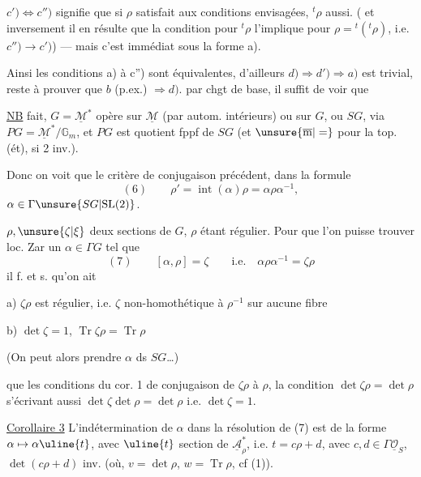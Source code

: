$c')\Longleftrightarrow c'')$ signifie que si $\rho$ satisfait aux conditions envisagées, ${}^t\rho$ aussi. ( et inversement il en résulte que la condition pour ${}^t\rho$ l'implique pour $\rho={}^t({}^t\rho)$\deleted{\unsure{$\}$}}, i.e. $c'')\longrightarrow c')$) --- mais c'est immédiat sous la forme a).

Ainsi les conditions a) à c'') sont équivalentes, d'ailleurs $d)\Longrightarrow d')\Longrightarrow a)$ est trivial, reste à prouver que $b$ (p.ex.) $\Rightarrow d)$.
 par chgt de base, il suffit de voir que




\uline{NB}\quad {} fait, $G=\underline{\mathcal M}^{*}$ opère sur $\underline{\mathcal M}$ (par autom. intérieurs) ou sur $G$, ou $SG$, via $PG=\underline{\mathcal M}^{*}/\mathbb G_m$, et $PG$ est quotient fppf de $SG$ (et $\unsure{\overline{\mathrm m}|=}$ pour la top. (ét), si 2 inv.).

Donc on voit que  le critère de conjugaison précédent, dans la formule
\[
(6)\qquad \rho'=\operatorname{int}(\alpha)\rho=\alpha\rho\alpha^{-1},
\]
 $\alpha\in\Gamma\unsure{SG|\mathrm{SL}(2)}$.

 $\rho,\unsure{\zeta|\xi}$ deux sections de $G$, $\rho$ étant régulier. Pour que l'on puisse trouver loc. Zar un $\alpha\in\Gamma G$ tel que
\[
(7)\qquad [\alpha,\rho]=\zeta\qquad\text{i.e.}\quad \alpha\rho\alpha^{-1}=\zeta\rho
\]
il f. et s. qu'on ait

a) $\zeta\rho$ est régulier, i.e. $\zeta$ \deleted{$\unsure{\neq}$} non-homothétique à $\rho^{-1}$ sur aucune fibre

b) $\det\zeta=1$, $\operatorname{Tr}\zeta\rho=\operatorname{Tr}\rho$

(On peut alors prendre $\alpha$ ds $SG$\ldots)

 que les conditions du cor. 1  de conjugaison de $\zeta\rho$ à $\rho$, la condition $\det\zeta\rho=\det\rho$ s'écrivant aussi $\det\zeta\det\rho=\det\rho$ i.e. $\det\zeta=1$.

\uline{Corollaire 3} L'indétermination de $\alpha$ dans la résolution de (7) est de la forme $\alpha\mapsto\alpha\uline{t}$, avec $\uline{t}$ section de $\underline{\mathcal A}_\rho^*$, i.e. $t=c\rho+d$, avec $c,d\in\Gamma\underline{\mathcal O}_S$, $\det(c\rho+d)$ inv.
(où, $v=\det\rho$, $w=\operatorname{Tr}\rho$, cf (1)).

